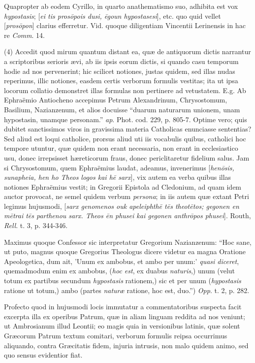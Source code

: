 Quapropter ab eodem Cyrillo, in quarto
anathematismo suo, adhibita est vox \emph{hypostasis}; [\emph{ei tis pros\={o}pois
dusi, \={e}goun hypostasesi}], etc. quo quid vellet [\emph{pros\={o}pon}]
clarius efferretur. Vid. quoque diligentiam Vincentii Lerinensis
in hac re \emph{Comm}. 14.

(4) Accedit quod mirum quantum distant ea, quæ
de antiquorum dictis narrantur a scriptoribus serioris ævi, ab iis
ipsis eorum dictis, si quando casu temporum hodie ad nos pervenerint;
hic scilicet notiones, justas quidem, sed illas nudas reperimus, illic
notiones, easdem certis verborum formulis vestitas; ita ut ipsa
locorum collatio demonstret illas formulas non pertinere ad vetustatem.
E.g. Ab Ephraëmio Antiocheno accepimus Petrum Alexandrinum,
Chrysostomum, Basilium, Nazianzenum, et alios docuisse ``duarum
naturarum unionem, unam hypostasin, unamque personam.'' \emph{ap}. Phot.
cod. 229, p. 805-7. Optime vero; quis dubitet sanctissimos viros in
gravissima materia Catholicas enunciasse sententias? Sed aliud est
loqui catholice, prorsus aliud uti iis vocabulis quibus, catholici hoc
tempore utuntur, quæ quidem non erant necessaria, non erant in
ecclesiastico usu, donec irrepsisset hæreticorum fraus, donec
periclitaretur fidelium salus. Jam si Chrysostomum, quem Ephraëmius
laudat, adeamus, invenerimus [\emph{hen\={o}sis, sunapheia, hen ho
Theos logos kai h\={e} sarx}], vix autem ea verba quibus illas
notiones Ephraëmius vestit; in Gregorii Epistola ad Cledonium, ad
quam idem auctor provocat, ne semel quidem verbum \emph{persona}; in
iis autem quæ extant Petri legimus hujusmodi, [\emph{sarx genomenos ouk
apeleiphth\={e} t\={e}s theot\={e}tos; gegonen en m\={e}trai
t\={e}s parthenou sarx. Theos \={e}n phusei kai gegonen anthr\={o}pos
phusei}]. Routh, \emph{Rell}. t. 3, p. 344-346.

Maximus quoque Confessor sic interpretatur
Gregorium Nazianzenum: ``Hoc sane, ut puto, magnus quoque
Gregorius Theologus dicere videtur ea magna Oratione Apeologetica, dum
ait, 'Unum ex ambobus, et ambo per unum:' \emph{quasi diceret},
quemadmodum enim ex ambobus, (\emph{hoc est}, ex duabus \emph{naturis},)
unum (velut totum ex partibus secundum \emph{hypostasis} rationem,)
sic et per unum (\emph{hypostasis} ratione ut totum,) ambo (partes \emph{naturæ}
ratione, hoc est, duo.'') \emph{Opp}. t. 2, p. 282.

Profecto quod in hujusmodi locis immutatur a
commentatoribus suspecta facit excerpta illa ex operibus Patrum, quæ
in aliam linguam reddita ad nos veniunt; ut Ambrosianum illud Leontii;
eo magis quia in versionibus latinis, quæ solent Græcorum Patrum
textum comitari, verborum formulis reipsa occurrimus aliquando, contra
Græcitatis fidem, injuria intrusis, non malo quidem animo, sed quo
sensus evidentior fiat.

